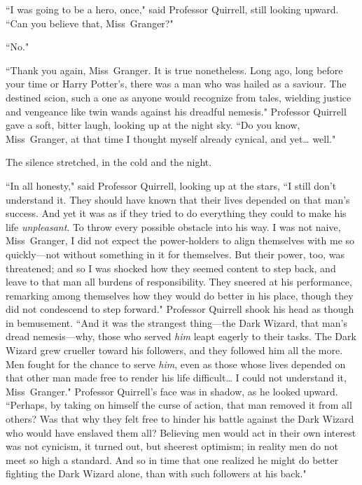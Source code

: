 ``I was going to be a hero, once," said Professor Quirrell, still looking upward. ``Can you believe that, Miss~Granger?"

``No."

``Thank you again, Miss~Granger. It is true nonetheless. Long ago, long before your time or Harry Potter's, there was a man who was hailed as a saviour. The destined scion, such a one as anyone would recognize from tales, wielding justice and vengeance like twin wands against his dreadful nemesis." Professor Quirrell gave a soft, bitter laugh, looking up at the night sky. ``Do you know, Miss~Granger, at that time I thought myself already cynical, and yet{\ldots} well."

The silence stretched, in the cold and the night.

``In all honesty," said Professor Quirrell, looking up at the stars, ``I still don't understand it. They should have known that their lives depended on that man's success. And yet it was as if they tried to do everything they could to make his life \emph{unpleasant}. To throw every possible obstacle into his way. I was not naive, Miss~Granger, I did not expect the power-holders to align themselves with me so quickly—not without something in it for themselves. But their power, too, was threatened; and so I was shocked how they seemed content to step back, and leave to that man all burdens of responsibility. They sneered at his performance, remarking among themselves how they would do better in his place, though they did not condescend to step forward." Professor Quirrell shook his head as though in bemusement. ``And it was the strangest thing—the Dark Wizard, that man's dread nemesis—why, those who served \emph{him} leapt eagerly to their tasks. The Dark Wizard grew crueller toward his followers, and they followed him all the more. Men fought for the chance to serve \emph{him}, even as those whose lives depended on that other man made free to render his life difficult{\ldots} I could not understand it, Miss~Granger." Professor Quirrell's face was in shadow, as he looked upward. ``Perhaps, by taking on himself the curse of action, that man removed it from all others? Was that why they felt free to hinder his battle against the Dark Wizard who would have enslaved them all? Believing men would act in their own interest was not cynicism, it turned out, but sheerest optimism; in reality men do not meet so high a standard. And so in time that one realized he might do better fighting the Dark Wizard alone, than with such followers at his back."

